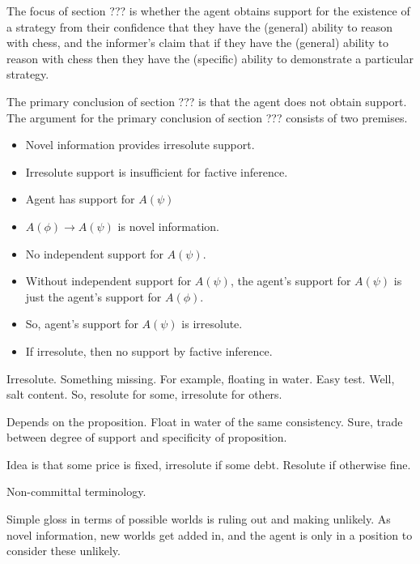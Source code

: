 \documentclass[10pt]{article}
\begin{document}
\begin{note}
  The focus of {\color{red} section ???} is whether the agent obtains support for the existence of a strategy from their confidence that they have the (general) ability to reason with chess, and the informer's claim that if they have the (general) ability to reason with chess then they have the (specific) ability to demonstrate a particular strategy.

  The primary conclusion of {\color{red} section ???} is that the agent does not obtain support.
  The argument for the primary conclusion of {\color{red} section ???} consists of two premises.

  \begin{itemize}
  \item Novel information provides irresolute support.
  \item Irresolute support is insufficient for factive inference.
  \end{itemize}

  \begin{itemize}
  \item Agent has support for \(A(\psi)\)
  \item \(A(\phi) \rightarrow A(\psi)\) is novel information.
  \item No independent support for \(A(\psi)\).
  \item Without independent support for \(A(\psi)\), the agent's support for \(A(\psi)\) is just the agent's support for \(A(\phi)\).
  \item So, agent's support for \(A(\psi)\) is irresolute.
  \item If irresolute, then no support by factive inference.
  \end{itemize}

  Irresolute.
  Something missing.
  For example, floating in water.
  Easy test.
  Well, salt content.
  So, resolute for some, irresolute for others.

  Depends on the proposition.
  Float in water of the same consistency.
  Sure, trade between degree of support and specificity of proposition.

  Idea is that some price is fixed, irresolute if some debt.
  Resolute if otherwise fine.

  Non-committal terminology.

  Simple gloss in terms of possible worlds is ruling out and making unlikely.
  As novel information, new worlds get added in, and the agent is only in a position to consider these unlikely.


\end{note}
\end{document}

